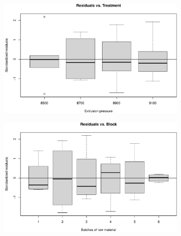 \documentclass[
  letterpaper,
]{scrbook}
\begin{document}
\begin{figure}
\begin{minipage}{0.50\linewidth}
\begin{figure}[H]
{}


\end{figure}%

\end{minipage}%
\newline
\begin{minipage}{0.50\linewidth}

\begin{figure}[H]

{\centering \includegraphics{unit5-factor/crbd_files/figure-pdf/plot-diagnostics-rcbd-3.pdf}

}


\end{figure}%

\end{minipage}%
%
\begin{minipage}{0.50\linewidth}

\begin{figure}[H]

{\centering \includegraphics{unit5-factor/crbd_files/figure-pdf/plot-diagnostics-rcbd-4.pdf}

}


\end{figure}%

\end{minipage}%

\end{figure}%
\end{document}
